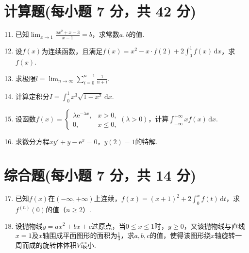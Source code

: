 \documentclass[../Main.tex]{subfiles}
\begin{document}
\section{计算题(每小题 7 分，共 42 分)}
\begin{enumerate}
    \setcounter{enumi}{10}
    \item 已知$\lim_{x\to1}\frac{ax^{2}+x-3}{x-1}=b$，求常数$a,b$的值.
          \vspace{12em}

    \item 设$f(x)$为连续函数，且满足$f(x)=x^{2}-x\cdot f(2)+2\int_{0}^{1}f(x
              )\,\mathrm{d}x$，求$f(x)$.
          \vspace{11em}

    \item 求极限$l=\lim_{n\to\infty}\sum_{i=0}^{n-1}\frac{1}{n+i}$.
          \vspace{11em}

    \item 计算定积分$I=\int_{0}^{1}x^{3}\sqrt{1-x^{2}}\,\mathrm{d}x$.
          \vspace{11em}

    \item 设函数$f(x)=
              \begin{cases}
                  \lambda \mathrm{e}^{-\lambda x}, & x>0,    \\
                  0,                               & x\leq0,
              \end{cases}(\lambda>0)$，计算$\int_{-\infty}^{+\infty}xf(x)\,\mathrm{d}x$.
          \vspace{12em}

    \item 求微分方程$xy'+y-\mathrm{e}^{x}=0$，$y(2)=1$的特解.
          \vspace{12em}
\end{enumerate}

\section{综合题(每小题 7 分，共 14 分)}
\begin{enumerate}
    \setcounter{enumi}{16}
    \item 已知$f(x)$在$(-\infty,+\infty)$上连续，$f(x)=(x+1)^{2}+2\int_{0}^{x}
              f(t)\,\mathrm{d}t$，求$f^{(n)}(0)$的值（$n\geq2$）.
          \vspace{12em}

    \item 设抛物线$y=ax^{2}+bx+c$过原点，当$0\leq x\leq 1$时，$y\geq0$，又该抛物线与直线$x
              =1$及$x$轴围成平面图形的面积为$\frac{1}{3}$，求$a,b,c$的值，使得该图形绕$x$轴旋转一周而成的旋转体体积$V$最小.
          \vspace{13em}
\end{enumerate}
\end{document}
